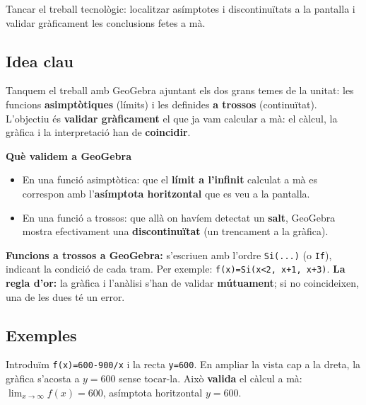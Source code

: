 %
{Tancar el treball tecnològic: localitzar asímptotes i discontinuïtats a la pantalla i validar gràficament les conclusions fetes a mà.}

\subsection{Idea clau}

Tanquem el treball amb GeoGebra ajuntant els dos grans temes de la unitat: les
funcions \textbf{asimptòtiques} (límits) i les definides \textbf{a trossos}
(continuïtat). L'objectiu és \textbf{validar gràficament} el que ja vam calcular a mà:
el càlcul, la gràfica i la interpretació han de \textbf{coincidir}.

\begin{idea}
\textbf{Què validem a GeoGebra}
\begin{itemize}[leftmargin=1.4em, itemsep=2pt]
  \item En una funció asimptòtica: que el \textbf{límit a l'infinit} calculat a mà es
        correspon amb l'\textbf{asímptota horitzontal} que es veu a la pantalla.
  \item En una funció a trossos: que allà on havíem detectat un \textbf{salt}, GeoGebra
        mostra efectivament una \textbf{discontinuïtat} (un trencament a la gràfica).
\end{itemize}
\textbf{Funcions a trossos a GeoGebra:} s'escriuen amb l'ordre \texttt{Si(...)} (o
\texttt{If}), indicant la condició de cada tram. Per exemple:
\texttt{f(x)=Si(x<2, x+1, x+3)}.
\textbf{La regla d'or:} la gràfica i l'anàlisi s'han de validar \textbf{mútuament}; si
no coincideixen, una de les dues té un error.
\end{idea}

\subsection{Exemples}

\begin{exemple}
Introduïm \texttt{f(x)=600-900/x} i la recta \texttt{y=600}. En ampliar la vista cap a
la dreta, la gràfica s'acosta a $y=600$ sense tocar-la. Això \textbf{valida} el càlcul
a mà: $\lim_{x\to\infty}f(x)=600$, asímptota horitzontal $y=600$.
\end{exemple}

